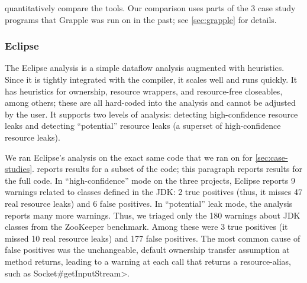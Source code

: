  quantitatively compare the
tools.  Our comparison uses parts of the 3 case study programs that Grapple was
run on in the past; see \cref{sec:grapple} for details.




\subsubsection{Eclipse}
\label{sec:eclipse}

The Eclipse analysis is a simple dataflow analysis
augmented with heuristics. Since it is tightly integrated with
the compiler, it scales well and runs quickly. It has
heuristics for ownership, resource wrappers, and resource-free
closeables, among others; these are all hard-coded into the analysis and cannot
be adjusted by the user.
It supports two levels of analysis: detecting high-confidence resource
leaks and detecting ``potential'' resource
leaks (a superset of high-confidence resource leaks).

We ran Eclipse's analysis on the exact same code
that we ran \tool on for \cref{sec:case-studies}.
 reports results for a subset of the code; this
paragraph reports results for the full code.
In ``high-confidence'' mode on the three projects, Eclipse reports 9
warnings related to classes defined in the JDK:
2 true positives (thus, it misses 47 real resource leaks) and 6
false positives.
In ``potential'' leak mode, the analysis reports many more warnings.
Thus, we triaged only the 180
warnings about JDK classes from the ZooKeeper benchmark.
Among these were 3 true positives (it missed 10 real resource leaks) and 177 false
positives.
The most common cause of false
positives was the unchangeable, default ownership transfer assumption
at method returns, leading to a warning at each call that returns a resource-alias, such as
\<Socket\#getInputStream>.



